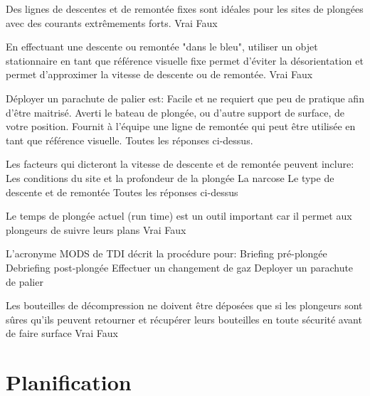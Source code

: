 \documentclass[english,12pt,a4paper]{article}
\begin{document}
\begin{outline}
		\1 Des lignes de descentes et de remontée fixes sont idéales pour les sites de plongées avec des courants extrêmements forts.
			\2 Vrai
			\2 Faux

		\1 En effectuant une descente ou remontée "dans le bleu", utiliser un objet stationnaire en tant que référence visuelle fixe permet d'éviter la désorientation et permet d'approximer la vitesse de descente ou de remontée.
			\2 Vrai
			\2 Faux

		\1 Déployer un parachute de palier est:
			\2 Facile et ne requiert que peu de pratique afin d'être maitrisé.
			\2 Averti le bateau de plongée, ou d'autre support de surface, de votre position.
			\2 Fournit à l'équipe une ligne de remontée qui peut être utilisée en tant que référence visuelle.
			\2 Toutes les réponses ci-dessus.

		\1 Les facteurs qui dicteront la vitesse de descente et de remontée peuvent inclure:
			\2 Les conditions du site et la profondeur de la plongée
			\2 La narcose
			\2 Le type de descente et de remontée
			\2  Toutes les réponses ci-dessus

		\1 Le temps de plongée actuel (run time) est un outil important car il permet aux plongeurs de suivre leurs plans
			\2 Vrai
			\2 Faux

		\1 L'acronyme MODS de TDI décrit la procédure pour:
			\2 Briefing pré-plongée
			\2 Debriefing post-plongée
			\2 Effectuer un changement de gaz
			\2 Deployer un parachute de palier

		\1 Les bouteilles de décompression ne doivent être déposées que si les plongeurs sont sûres qu'ils peuvent retourner et récupérer leurs bouteilles en toute sécurité avant de faire surface
			\2 Vrai
			\2 Faux
	\end{outline}
	\pagebreak

	\section{Planification}
\end{document}
